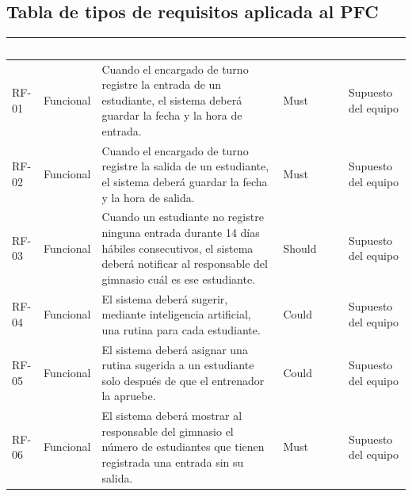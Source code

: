 \subsection{Tabla de tipos de requisitos aplicada al PFC}

{\small
\begin{xltabular}{\textwidth}{|>{\raggedright\arraybackslash}p{1.3cm}|>{\raggedright\arraybackslash}p{2.4cm}|L|>{\centering\arraybackslash}p{1.6cm}|>{\raggedright\arraybackslash}p{2.4cm}|}
\hline
{}\textcolor{white}{\textbf{ID}} & \textcolor{white}{\textbf{Tipo}} & \textcolor{white}{\textbf{Descripción}} & \textcolor{white}{\textbf{MoSCoW}} & \textcolor{white}{\textbf{Fuente}} \\ \hline
\endhead
RF-01 & Funcional & Cuando el encargado de turno registre la entrada de un estudiante, el sistema deberá guardar la fecha y la hora de entrada. & Must & Supuesto del equipo \\ \hline
RF-02 & Funcional & Cuando el encargado de turno registre la salida de un estudiante, el sistema deberá guardar la fecha y la hora de salida. & Must & Supuesto del equipo \\ \hline
RF-03 & Funcional & Cuando un estudiante no registre ninguna entrada durante 14 días hábiles consecutivos, el sistema deberá notificar al responsable del gimnasio cuál es ese estudiante. & Should & Supuesto del equipo \\ \hline
RF-04 & Funcional & El sistema deberá sugerir, mediante inteligencia artificial, una rutina para cada estudiante. & Could & Supuesto del equipo \\ \hline
RF-05 & Funcional & El sistema deberá asignar una rutina sugerida a un estudiante solo después de que el entrenador la apruebe. & Could & Supuesto del equipo \\ \hline
RF-06 & Funcional & El sistema deberá mostrar al responsable del gimnasio el número de estudiantes que tienen registrada una entrada sin su salida. & Must & Supuesto del equipo \\ \hline

\end{xltabular}}
